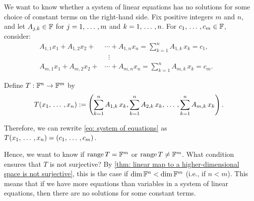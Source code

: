 \begin{prf} We want to know whether a system of linear equations has no solutions for some choice of constant terms on the right-hand side. Fix positive integers $m$ and $n$, and let $A_{j,k} \in \mathbb{F}$ for $j = 1, {\, \ldots \,\,}, m$ and $k = 1, {\, \ldots \,\,}, n$. For $c_1, {\, \ldots \,\,}, c_m \in \mathbb{F}$, consider:
  \begin{equation}
    \label{eq: system of equations}
    \begin{aligned}
      A_{1,1}x_1 + A_{1,2}x_2 + &\cdots + A_{1,n}x_n = \sum_{k=1}^n A_{1,k}\,x_k = c_1,\\
      &\; \; \vdots & \\
      A_{m,1}x_1 + A_{m,2}x_2 + &\cdots + A_{m,n}x_n = \sum_{k=1}^n A_{m,k}\,x_k = c_m.
    \end{aligned}
  \end{equation}

  Define $T: \mathbb{F}^n \to \mathbb{F}^m$ by
  \begin{equation}
    T(x_1, {\, \ldots \,\,}, x_n) := \left(\sum_{k=1}^n A_{1,k}\,x_k,\sum_{k=1}^n A_{2,k}\,x_k, {\, \ldots \,\,}, \sum_{k=1}^n A_{m,k}\,x_k \right).
  \end{equation}

  Therefore, we can rewrite \eqref{eq: system of equations} as $T(x_1, {\, \ldots \,\,}, x_n) = (c_1, {\, \ldots \,\,}, c_m)$.

  Hence, we want to know if $\operatorname{range} T = \mathbb{F}^m$ or $\operatorname{range} T \neq \mathbb{F}^m$. What condition ensures that $T$ is not surjective? By \ref{thm: linear map to a higher-dimensional space is not surjective}, this is the case if $\dim \mathbb{F}^n < \dim \mathbb{F}^m$ (i.e., if $n<m$). This means that if we have more equations than variables in a system of linear equations, then there are no solutions for some constant terms.
\end{prf}

%
%

%
%
%
%
%
